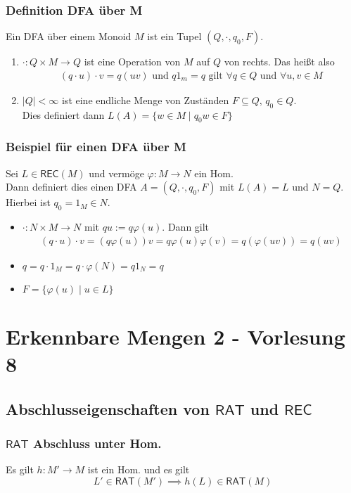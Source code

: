 \documentclass[12pt, german]{article}
\newcommand{\rat}{\mathsf{RAT}}
\newcommand{\rec}{\mathsf{REC}}
\begin{document}
	\subsubsection{Definition DFA über M}
	Ein DFA über einem Monoid $M$ ist ein Tupel $(Q, \cdot, q_0, F)$. 
	\begin{enumerate}[label=\arabic*)]
		\item $\cdot: Q \times M \to Q$ ist eine Operation von $M$ auf $Q$ von rechts. Das heißt also
		\begin{align*}
			(q \cdot u) \cdot v = q(uv) \text{ und } q1_m = q \text{ gilt } \forall q \in Q \text{ und } \forall u,v \in M
		\end{align*}
		\item $|Q| < \infty$ ist eine endliche Menge von Zuständen $F\subseteq Q,  \, q_0 \in Q$. \\
		Dies definiert dann $L(A) = \{w \in M \mid q_0w \in F\}$
	\end{enumerate}
	
	\subsubsection{Beispiel für einen DFA über M}
	Sei $L \in \rec(M)$ und vermöge $\varphi: M \to N$ ein Hom. \\ 
	Dann definiert dies einen DFA $A = (Q,\cdot, q_0, F)$ mit $L(A) = L$ und $N = Q$. 
	Hierbei ist $q_0 = 1_M \in N$. 
	\begin{itemize}
		\item $\cdot : N \times M \to N$ mit $qu := q\varphi(u)$. Dann gilt
		\begin{align*}
			(q \cdot u)\cdot v = (q\varphi(u))v = q \varphi(u)\varphi(v) = q(\varphi(uv)) = q(uv)
		\end{align*}
		\item $q = q \cdot 1_M = q \cdot \varphi(N) = q1_N = q$
		\item $F = \{\varphi(u) \mid u \in L \}$
	\end{itemize}
	
	\section{Erkennbare Mengen 2 - Vorlesung 8}
	\subsection{Abschlusseigenschaften von $\rat$ und $\rec$}
	\subsubsection{$\rat$ Abschluss unter Hom.}
	Es gilt $h: M' \to M$ ist ein Hom. und es gilt $$L' \in \rat(M') \implies h(L) \in \rat(M)$$
	
\end{document}
